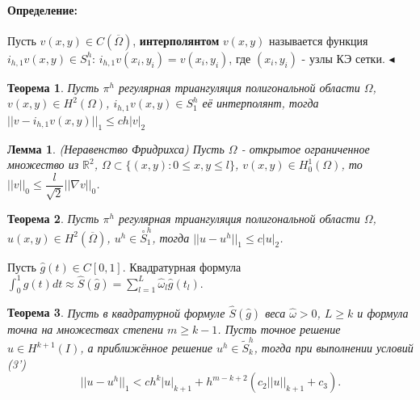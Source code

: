 \documentclass{article}
\newtheorem{theorem}{Теорема}
\newtheorem{lemma}{Лемма}
\newenvironment{definition}{ \paragraph{Определение:}}{\hfill $\blacktriangleleft$}
\begin{document}
\begin{definition}
	Пусть $v(x,y) \in C(\overline{\Omega})$, \textbf{интерполянтом} $v(x,y)$ называется функция $i_{h,1} v(x,y) \in S_1^h$: $i_{h,1} v(x_i,y_i) = v(x_i, y_i)$, где $(x_i,y_i)$ - узлы КЭ сетки.
\end{definition}

\begin{theorem}
	Пусть $\pi^h$ регулярная триангуляция полигональной области $\Omega$, $v(x,y) \in H^2(\Omega)$, $ i_{h,1} v(x,y) \in S_1^h$ её интерполянт, тогда $||v -i_{h,1} v(x,y)||_1 \leqslant ch |v|_2 $
\end{theorem}

\begin{lemma}
	(Неравенство Фридрихса) Пусть $\Omega$ - открытое ограниченное множество из $\mathbb{R}^2$, $\Omega \subset \{(x,y): 0\leqslant x,y \leqslant l\}$, $v(x,y) \in H_0^1(\Omega)$, то $||v||_0 \leqslant \dfrac{l}{\sqrt{2}} || \nabla v||_0$.
\end{lemma}

\begin{theorem}
	Пусть $\pi^h$ регулярная триангуляция полигональной области $\Omega$, $u(x,y) \in H^2(\overline{\Omega})$, $ u^h \in \overset{\circ}{S}_1^h$, тогда $||u - u^h||_1 \leqslant c |u|_2$.
\end{theorem}

Пусть $\hat{g}(t) \in C[0,1]$. Квадратурная формула $\int_0^1 \hat{g}(t) dt \approx \hat{S}(\hat{g}) = \sum_{l = 1}^{L} \hat{\omega}_l \hat{g}(t_l)$.

\begin{theorem}
	Пусть в квадратурной формуле $\hat{S}(\hat{g})$ веса $\hat{\omega} > 0$, $L \geqslant k$ и формула точна на множествах степени $m \geqslant k - 1$. Пусть точное решение $u \in H^{k+1}(I)$, а приближённое решение $u^h \in \tilde{S}_k^h$, тогда при выполнении условий (3')
	\[
	|| u - u^h||_1 < ch^k |u|_{k+1} + h^{m-k+2}(c_2 ||u||_{k+1} + c_3).	
	\]
\end{theorem}
\end{document}
